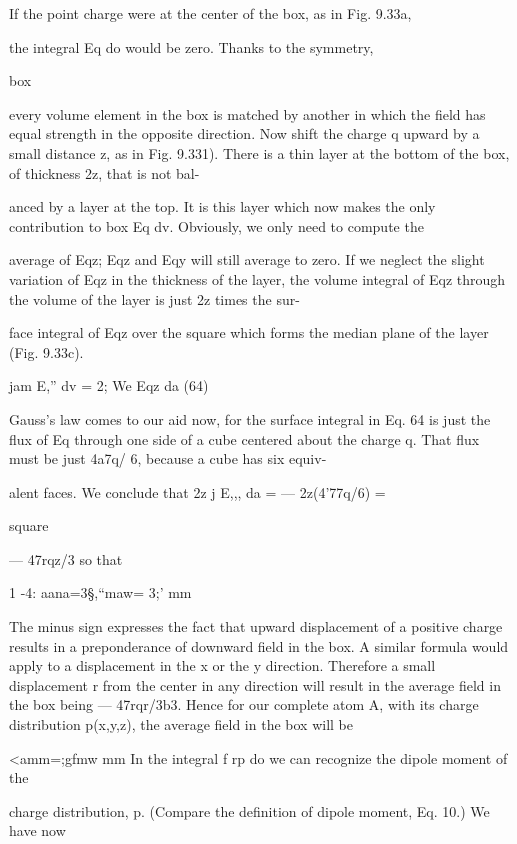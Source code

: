 {{{If the point charge were at the center of the box, as in Fig. 9.33a,

the integral Eq do would be zero. Thanks to the symmetry,

box

every volume element in the box is matched by another in which the
field has equal strength in the opposite direction. Now shift the
charge q upward by a small distance z, as in Fig. 9.331). There is a
thin layer at the bottom of the box, of thickness 2z, that is not bal-

 

anced by a layer at the top. It is this layer which now makes the only
contribution to box Eq dv. Obviously, we only need to compute the

average of Eqz; Eqz and Eqy will still average to zero. If we neglect the
slight variation of Eqz in the thickness of the layer, the volume integral
of Eqz through the volume of the layer is just 2z times the sur-

face integral of Eqz over the square which forms the median plane
of the layer (Fig. 9.33c).

\begin{equation}
\end{equation}
jam E,'' dv = 2; We Eqz da (64)

Gauss's law comes to our aid now, for the surface integral in Eq. 64
is just the flux of Eq through one side of a cube centered about the
charge q. That flux must be just 4a7q/ 6, because a cube has six equiv-

alent faces. We conclude that 2z j E,,, da =  --- 2z(4'77q/6) =

square

 ---  47rqz/3 so that

1 -4:
aana=3§,``maw= 3;' mm

The minus sign expresses the fact that upward displacement of a
positive charge results in a preponderance of downward field in the
box. A similar formula would apply to a displacement in the x or
the y direction. Therefore a small displacement r from the center in
any direction will result in the average field in the box being
 --- 47rqr/3b3. Hence for our complete atom A, with its charge distribution
p(x,y,z), the average field in the box will be

<amm=;gfmw mm
In the integral f rp do we can recognize the dipole moment of the

charge distribution, p. (Compare the definition of dipole moment,
Eq. 10.) We have now

}}}
